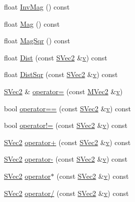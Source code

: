 \begin{CompactItemize}
float \hyperlink{struct_s_vec2_69d4a12808390dd9954d6f27e26a2d0f}{InvMag} () const 
\item 
float \hyperlink{struct_s_vec2_caf2ec0af3ba4f9a3df6fc9ecdcf6cbf}{Mag} () const 
\item 
float \hyperlink{struct_s_vec2_5f6455a9bea6b729e3c8c1124b30fada}{MagSqr} () const 
\item 
float \hyperlink{struct_s_vec2_a6b9f4be7a7a39d41dab8d71f17e226b}{Dist} (const \hyperlink{struct_s_vec2}{SVec2} \&\hyperlink{glext__bak_8h_5cf89b94f7478c0ebc4429b60e7ef93b}{v}) const 
\item 
float \hyperlink{struct_s_vec2_4add0ea646e454bba57d5c7312a17aab}{DistSqr} (const \hyperlink{struct_s_vec2}{SVec2} \&\hyperlink{glext__bak_8h_5cf89b94f7478c0ebc4429b60e7ef93b}{v}) const 
\item 
\hyperlink{struct_s_vec2}{SVec2} \& \hyperlink{struct_s_vec2_7d443082f1747463113b55d637b5452c}{operator=} (const \hyperlink{class_m_vec2}{MVec2} \&\hyperlink{glext__bak_8h_5cf89b94f7478c0ebc4429b60e7ef93b}{v})
\item 
bool \hyperlink{struct_s_vec2_a72ccdb5edf74c8746b1e16c45ab5f96}{operator==} (const \hyperlink{struct_s_vec2}{SVec2} \&\hyperlink{glext__bak_8h_5cf89b94f7478c0ebc4429b60e7ef93b}{v}) const 
\item 
bool \hyperlink{struct_s_vec2_fac02ca04954e66666b38fc148e20f76}{operator!=} (const \hyperlink{struct_s_vec2}{SVec2} \&\hyperlink{glext__bak_8h_5cf89b94f7478c0ebc4429b60e7ef93b}{v}) const 
\item 
\hyperlink{struct_s_vec2}{SVec2} \hyperlink{struct_s_vec2_25becdef04d3c9b6b626cf28e6436bed}{operator+} (const \hyperlink{struct_s_vec2}{SVec2} \&\hyperlink{glext__bak_8h_5cf89b94f7478c0ebc4429b60e7ef93b}{v}) const 
\item 
\hyperlink{struct_s_vec2}{SVec2} \hyperlink{struct_s_vec2_97c12ba0c952ce566ebab5b8ba62e2fd}{operator-} (const \hyperlink{struct_s_vec2}{SVec2} \&\hyperlink{glext__bak_8h_5cf89b94f7478c0ebc4429b60e7ef93b}{v}) const 
\item 
\hyperlink{struct_s_vec2}{SVec2} \hyperlink{struct_s_vec2_1c9c613fc0dfc116d34ec3d036a3f134}{operator$\ast$} (const \hyperlink{struct_s_vec2}{SVec2} \&\hyperlink{glext__bak_8h_5cf89b94f7478c0ebc4429b60e7ef93b}{v}) const 
\item 
\hyperlink{struct_s_vec2}{SVec2} \hyperlink{struct_s_vec2_5f8b6d2bde6538b5ae7ab0197e8f7c4b}{operator/} (const \hyperlink{struct_s_vec2}{SVec2} \&\hyperlink{glext__bak_8h_5cf89b94f7478c0ebc4429b60e7ef93b}{v}) const 
\item 

\end{CompactItemize}
